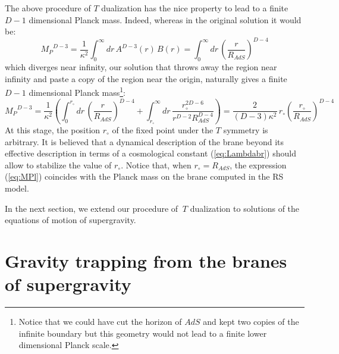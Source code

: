 \documentclass[a4paper,12pt]{article}
\def\MPlanck{{M_P}}
\def\Rads{R_{\scriptscriptstyle AdS}}
\begin{document}
The above procedure of $T$ dualization has the nice property to lead
to a finite $D-1$ dimensional Planck mass. Indeed, whereas in the original
solution it would be:
%
\begin{equation}
\MPlanck^{D-3} =
\frac{1}{\kappa^2} \int_{0}^{\infty}
dr \, A^{D-3} (r) \, B(r)=
\int_{0}^{\infty}
dr \, \left( \frac{r}{\Rads} \right)^{D-4}
\end{equation}
%
which diverges near infinity, our solution that throws away the region near
infinity and paste a copy of the region near the origin, naturally gives
a finite   $D-1$ dimensional Planck mass\footnote{Notice that we could have
cut the horizon of $AdS$ and kept two copies of the infinite boundary but
this geometry would not lead to a finite lower dimensional Planck scale.}:
%
\begin{equation}
	\label{eq:MPl}
\MPlanck^{D-3} =
\frac{1}{\kappa^2}
\left(
\int_{0}^{r_\circ}
dr \,  \left( \frac{r}{\Rads} \right)^{D-4}
+
\int_{r_\circ}^{\infty}
dr \,  \frac{r_\circ^{2D-6}}{r^{D-2}\Rads^{D-4}}
\right)
=
\frac{2}{(D-3)\kappa^2}\, r_\circ \left( \frac{r_\circ}{\Rads} \right)^{D-4}
\end{equation}
%
At this stage, the position $r_\circ$ of the fixed point under the $T$ symmetry is
arbitrary. It is believed that a dynamical description of the brane beyond its
effective description in terms of a cosmological constant (\ref{eq:Lambdabr}) should
allow to stabilize the value of $r_\circ$. Notice that, when $r_\circ=\Rads$,
the expression (\ref{eq:MPl}) coincides with the Planck mass on the brane computed in
the RS model.

In the next section, we extend our procedure of $\ T$ dualization to solutions
of the equations of motion of supergravity.


\section{Gravity trapping from the branes of supergravity}
\end{document}
